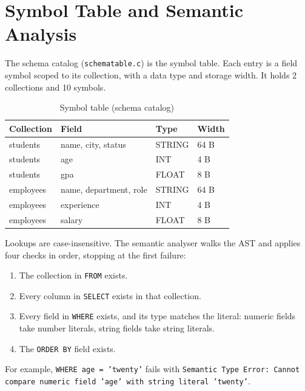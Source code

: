\documentclass[12pt,a4paper]{report}
\newcommand{\codeus}{\textunderscore\allowbreak}
\DeclareRobustCommand{\code}[1]{\texttt{\let\_\codeus #1}}
\begin{document}
\section{Symbol Table and Semantic Analysis}
The schema catalog (\code{schema\_table.c}) is the symbol table. Each entry is a field symbol scoped to its collection, with a data type and storage width. It holds 2 collections and 10 symbols.
\begin{table}[H]
\centering\small
\begin{tabular}{|l|l|l|l|}
\hline
\textbf{Collection} & \textbf{Field} & \textbf{Type} & \textbf{Width} \\ \hline
students & name, city, status & STRING & 64 B \\ \hline
students & age & INT & 4 B \\ \hline
students & gpa & FLOAT & 8 B \\ \hline
employees & name, department, role & STRING & 64 B \\ \hline
employees & experience & INT & 4 B \\ \hline
employees & salary & FLOAT & 8 B \\ \hline
\end{tabular}
\caption{Symbol table (schema catalog)}
\end{table}

Lookups are case-insensitive. The semantic analyser walks the AST and applies four checks in order, stopping at the first failure:
\begin{enumerate}
  \item The collection in \code{FROM} exists.
  \item Every column in \code{SELECT} exists in that collection.
  \item Every field in \code{WHERE} exists, and its type matches the literal: numeric fields take number literals, string fields take string literals.
  \item The \code{ORDER BY} field exists.
\end{enumerate}
For example, \code{WHERE age = 'twenty'} fails with \code{Semantic Type Error: Cannot compare numeric field 'age' with string literal 'twenty'}.
\end{document}

